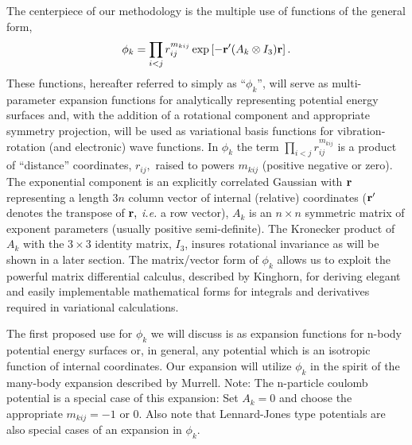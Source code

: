 The centerpiece of our methodology is the multiple use of functions of the
general form, 
\begin{equation}
\phi _k=\prod_{i<j}r_{ij}^{m_{kij}}\exp \left[ -{\bf r}^{\prime }(A_k\otimes
I_3){\bf r}\right] .  \label{basisfcn}
\end{equation}
These functions, hereafter referred to simply as ``$\phi _k$'', will serve
as multi-parameter expansion functions for analytically representing
potential energy surfaces and, with the addition of a rotational component
and appropriate symmetry projection, will be used as variational basis
functions for vibration-rotation (and electronic) wave functions. In $\phi
_k $ the term $\prod_{i<j}r_{ij}^{m_{kij}}$ is a product of ``distance''
coordinates, $r_{ij},$ raised to powers $m_{kij}$ (positive negative or
zero). The exponential component is an explicitly correlated Gaussian with $%
{\bf r}$ representing a length $3n$ column vector of internal (relative)
coordinates (${\bf r}^{\prime }$ denotes the transpose of ${\bf r,}$ {\it %
i.e.} a row vector), $A_k$ is an $n\times n$ symmetric matrix of exponent
parameters (usually positive semi-definite). The Kronecker product of $A_k$
with the $3\times 3$ identity matrix, $I_3$, insures rotational invariance
as will be shown in a later section. The matrix/vector form of $\phi _k$
allows us to exploit the powerful matrix differential calculus, described by
Kinghorn\cite{Kinghorn95a}, for deriving elegant and easily implementable
mathematical forms for integrals and derivatives required in variational
calculations.

The first proposed use for $\phi _k$ we will discuss is as expansion
functions for n-body potential energy surfaces or, in general, any potential
which is an isotropic function of internal coordinates. Our expansion will
utilize $\phi _k$ in the spirit of the many-body expansion described by
Murrell\cite{Murrell84}. Note: The n-particle coulomb potential is a special
case of this expansion: Set $A_k=0$ and choose the appropriate $m_{kij}=-1$%
or $0$. Also note that Lennard-Jones type potentials are also special cases
of an expansion in $\phi _k.$

